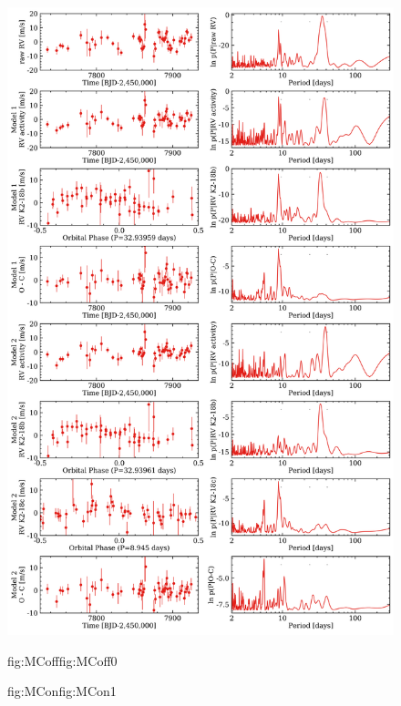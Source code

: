 \begin{figure} %
  \centering
  \includegraphics[width=0.8\hsize]{figures/analysisC_bkgd.png}%
  \hspace{-0.8\hsize}%
  \begin{ocg}{fig:MCoff}{fig:MCoff}{0}%
  \end{ocg}%
  \begin{ocg}{fig:MCon}{fig:MCon}{1}%

\end{ocg}
\end{figure}
